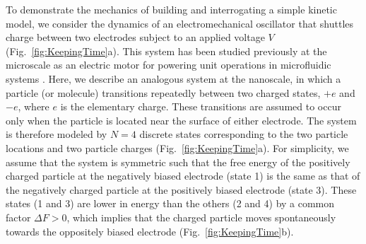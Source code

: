 \begin{appendices}
To demonstrate the mechanics of building and interrogating a simple kinetic model, we consider the dynamics of an electromechanical oscillator that shuttles charge between two electrodes subject to an applied voltage $V$ (Fig.~\ref{fig:KeepingTime}a). This system has been studied previously at the microscale as an electric motor for powering unit operations in microfluidic systems \autocite{bishop2018contact,drews2015contact}.  Here, we describe an analogous system at the nanoscale, in which a particle (or molecule) transitions repeatedly between two charged states, $+e$ and $-e$, where $e$ is the elementary charge.  These transitions are assumed to occur only when the particle is located near the surface of either electrode.  The system is therefore modeled by $N=4$ discrete states corresponding to the two particle locations and two particle charges (Fig.~\ref{fig:KeepingTime}a).  For simplicity, we assume that the system is symmetric such that the free energy of the positively charged particle at the negatively biased electrode (state 1) is the same as that of the negatively charged particle at the positively biased electrode (state 3).  These states (1 and 3) are lower in energy than the others (2 and 4) by a common factor $\Delta F>0$, which implies that the charged particle moves spontaneously towards the oppositely biased electrode (Fig.~\ref{fig:KeepingTime}b).


\end{appendices}
